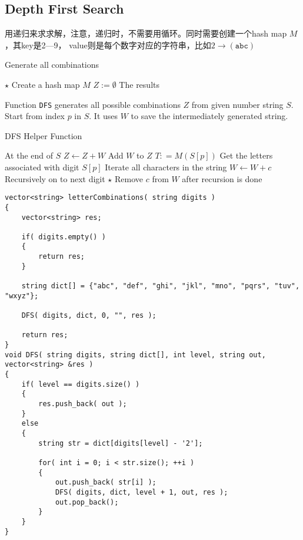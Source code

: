 \subsection{Depth First Search}
用递归来求求解，注意，递归时，不需要用循环。同时需要创建一个hash map $M$，其key是2---9， value则是每个数字对应的字符串，比如$2 \rightarrow (\texttt{abc})$
\setcounter{algorithm}{0}
\begin{algorithm}[H]
\caption{Generate all combinations}
\begin{algorithmic}[1]
\State $\star$ Create a hash map $M$
\State $Z := \emptyset$ \Comment The results
\State {} 
\EndProcedure
\end{algorithmic}
\end{algorithm}
Function \texttt{DFS} generates all possible combinations $Z$ from given number string $S$. Start from index $p$ in $S$. It uses $W$ to save the intermediately generated string.
\begin{algorithm}[H]
\caption{DFS Helper Function}
\begin{algorithmic}[1]
 \Comment At the end of $S$
\State $Z\gets Z+W$ \Comment Add $W$ to $Z$
\State \Return
\EndIf
\State $T: = M(S[p])$ \Comment Get the letters associated with digit $S[p]$
 \Comment Iterate all characters in the string
\State $W \gets W+c$ 
\State {} \Comment Recursively on to next digit
\State $\star$ Remove $c$ from $W$ after recursion is done
\EndFor
\EndFunction
\end{algorithmic}
\end{algorithm}
\setcounter{lstlisting}{0}
\begin{lstlisting}[style=customc, caption={DFS}]
vector<string> letterCombinations( string digits )
{
    vector<string> res;

    if( digits.empty() )
    {
        return res;
    }

    string dict[] = {"abc", "def", "ghi", "jkl", "mno", "pqrs", "tuv", "wxyz"};

    DFS( digits, dict, 0, "", res );

    return res;
}
void DFS( string digits, string dict[], int level, string out, vector<string> &res )
{
    if( level == digits.size() )
    {
        res.push_back( out );
    }
    else
    {
        string str = dict[digits[level] - '2'];

        for( int i = 0; i < str.size(); ++i )
        {
            out.push_back( str[i] );
            DFS( digits, dict, level + 1, out, res );
            out.pop_back();
        }
    }
}
\end{lstlisting}